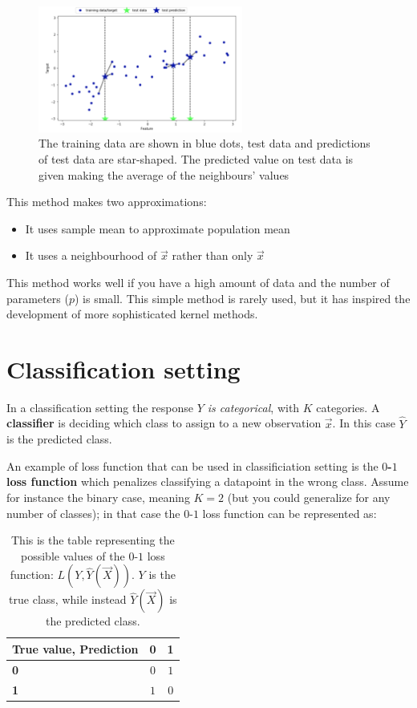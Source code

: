 \begin{figure}[ht]
\caption{The training data are shown in blue dots, test data and predictions of test data are star-shaped. The predicted value on test data is given making the average of the neighbours' values}
\centering
\includegraphics[width=0.6\textwidth]{KNNregression}
\end{figure}


      This method makes two approximations:
      \begin{itemize}
        \item It uses sample mean to approximate population mean
        \item It uses a neighbourhood of $\vec{x}$ rather than only $\vec{x}$
      \end{itemize}
      
      This method works well if you have a high amount of data and the number of
      parameters ($p$) is small. This simple method is rarely used, but it has
      inspired the development of more sophisticated kernel methods.

  \section{Classification setting} \label{sect: classification}
    In a classification setting the response \textit{$Y$ is categorical}, with $K$
    categories. A \textbf{classifier} is deciding which class to assign to a new
    observation $\vec{x}$. In this case $\hat{Y}$ is the predicted class.
    
    An example of loss function that can be used in classificiation setting is
    the \textbf{$0$-$1$ loss function} which penalizes classifying a datapoint in
    the wrong class. Assume for instance the binary case, meaning $K = 2$ (but
    you could generalize for any number of classes); in that case the $0$-$1$ loss
    function can be represented as:
    
\begin{table}[h]
\centering
\begin{tabular}{|l||c|c|}
	\hline
	\textbf{True value, Prediction} & \textbf{0} & \textbf{1} \\
	\hline
	\hline
	\textbf{0} &  $0$ & $1$ \\
	\hline
	\textbf{\textbf{1}} & $1$ & $0$\\
	\hline
\end{tabular}
\caption{This is the table representing the possible values of the $0$-$1$ loss
function: $ L(Y, \hat{Y}(\vec{X})) $. $Y$ is the true class, while instead
$\hat{Y}(\vec{X})$ is the predicted class.}
\end{table} 
    

